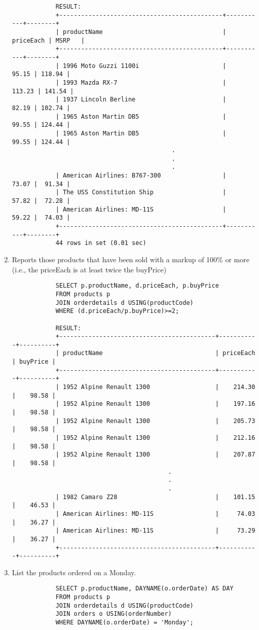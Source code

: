 \documentclass{article}
\begin{document}
\begin{enumerate}
\begin{verbatim}
			RESULT:
			+---------------------------------------------+-----------+--------+
			| productName                                 | priceEach | MSRP   |
			+---------------------------------------------+-----------+--------+
			| 1996 Moto Guzzi 1100i                       |     95.15 | 118.94 |
			| 1993 Mazda RX-7                             |    113.23 | 141.54 |
			| 1937 Lincoln Berline                        |     82.19 | 102.74 |
			| 1965 Aston Martin DB5                       |     99.55 | 124.44 |
			| 1965 Aston Martin DB5                       |     99.55 | 124.44 |
			                                .
			                                .
			                                .
			| American Airlines: B767-300                 |     73.07 |  91.34 |
			| The USS Constitution Ship                   |     57.82 |  72.28 |
			| American Airlines: MD-11S                   |     59.22 |  74.03 |
			+---------------------------------------------+-----------+--------+
			44 rows in set (0.01 sec)
			\end{verbatim}
		\item Reports those products that have been sold with a markup of 100\% or more (i.e.,  the priceEach is at least twice the buyPrice)
			\begin{verbatim}
			SELECT p.productName, d.priceEach, p.buyPrice
			FROM products p
			JOIN orderdetails d USING(productCode)
			WHERE (d.priceEach/p.buyPrice)>=2;
			
			RESULT:
			+-------------------------------------------+-----------+----------+
			| productName                               | priceEach | buyPrice |
			+-------------------------------------------+-----------+----------+
			| 1952 Alpine Renault 1300                  |    214.30 |    98.58 |
			| 1952 Alpine Renault 1300                  |    197.16 |    98.58 |
			| 1952 Alpine Renault 1300                  |    205.73 |    98.58 |
			| 1952 Alpine Renault 1300                  |    212.16 |    98.58 |
			| 1952 Alpine Renault 1300                  |    207.87 |    98.58 |
			                               .
			                               .
			                               .
			| 1982 Camaro Z28                           |    101.15 |    46.53 |
			| American Airlines: MD-11S                 |     74.03 |    36.27 |
			| American Airlines: MD-11S                 |     73.29 |    36.27 |
			+-------------------------------------------+-----------+----------+
			\end{verbatim}
		\item List the products ordered on a Monday.
			\begin{verbatim}
			SELECT p.productName, DAYNAME(o.orderDate) AS DAY
			FROM products p
			JOIN orderdetails d USING(productCode)
			JOIN orders o USING(orderNumber)
			WHERE DAYNAME(o.orderDate) = 'Monday';
			

\end{verbatim}
\end{enumerate}
\end{document}
